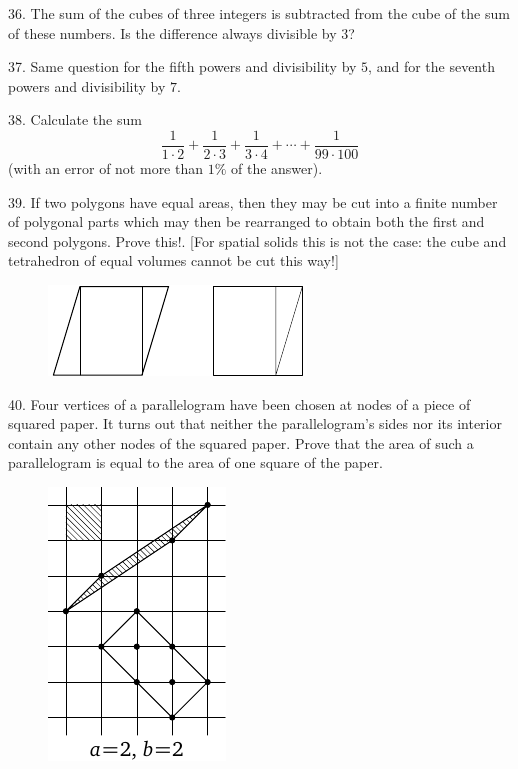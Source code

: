 \begin{problem}{36.}
	The sum of the cubes of three integers is subtracted from the cube of the sum of these numbers. Is the difference always divisible by $3$?
\end{problem}

\begin{problem}{37.}
	Same question for the fifth powers and divisibility by $5$, and for the seventh powers and divisibility by $7$.
\end{problem}

\begin{problem}{38.}
	Calculate the sum
	\begin{equation*}
		\frac{1}{1\cdot 2} + \frac{1}{2\cdot 3} + \frac{1}{3\cdot 4} + \dotsb + \frac{1}{99\cdot 100}
	\end{equation*}
	(with an error of not more than $1\%$ of the answer).
\end{problem}

\begin{problem}{39.}
	If two polygons have equal areas, then they may be cut into a finite number of polygonal parts which may then be rearranged to obtain both the first and second polygons. Prove this!. [For spatial solids this is not the case: the cube and tetrahedron of equal volumes cannot be cut this way!]
	\begin{figure}
		\includegraphics{q39_horizontal}
	\end{figure}
\end{problem}

\begin{problem}{40.}
	Four vertices of a parallelogram have been chosen at nodes of a piece of squared paper. It turns out that neither the parallelogram's sides nor its interior contain any other nodes of the squared paper. Prove that the area of such a parallelogram is equal to the area of one square of the paper. 
	\begin{figure}
		\includegraphics{taskbook-24}
	\end{figure}
\end{problem}

